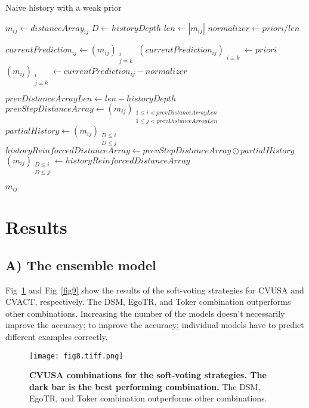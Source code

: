 \documentclass[10pt,letterpaper]{article}
\begin{document}
\begin{algorithm}[H]
  \caption{Naive history with a weak prior}\label{alg:three}
  $m_{ij} \gets distanceArray_{ij}$\;
  $D \gets historyDepth$\;
  $len \gets |m_{ij}|$\;
  $normalizer \gets priori/ len$\;
  
   {
      $currentPrediction_{ij} \gets (m_{ij})_{\substack{i\\ j \equiv k }}$\;
      $ (currentPrediction_{ij})_{\substack{i \equiv k}} \gets priori$\;
      $(m_{ij})_{\substack{i\\ j \equiv k }} \gets currentPrediction_{ij} - normalizer$\;
  }
  
   {
      $prevDistanceArrayLen \gets len - historyDepth$\;
      $prevStepDistanceArray \gets (m_{ij})_{\substack{1\le i < prevDistanceArrayLen \\ 1\le j < prevDistanceArrayLen }}$\;
      $partialHistory \gets (m_{ij})_{\substack{D \le i \\ D \le j}}$\;
      $historyReinforcedDistanceArray \gets prevStepDistanceArray \odot partialHistory$\;
      $(m_{ij})_{\substack{D \le i \\ D \le j}} \gets historyReinforcedDistanceArray$\;
  }
  
  \Return $m_{ij}$\;
  \end{algorithm}

  \FloatBarrier

\section*{Results}
\subsection*{A) The ensemble model}
Fig~\ref{fig8} and Fig~\ref{fig9} show the results of the soft-voting strategies for CVUSA and CVACT, respectively. The DSM, EgoTR, and Toker combination outperforms other combinations. Increasing the number of the models doesn’t necessarily improve the accuracy; to improve the accuracy; individual models have to predict different examples correctly.

\begin{figure}[!h]
  \caption{{\bf CVUSA combinations for the soft-voting strategies. The dark bar is the best performing combination.} The DSM, EgoTR, and Toker combination outperforms other combinations.}
  \texttt{[image: fig8.tiff.png]}
  \label{fig8}
\end{figure}
\end{document}

